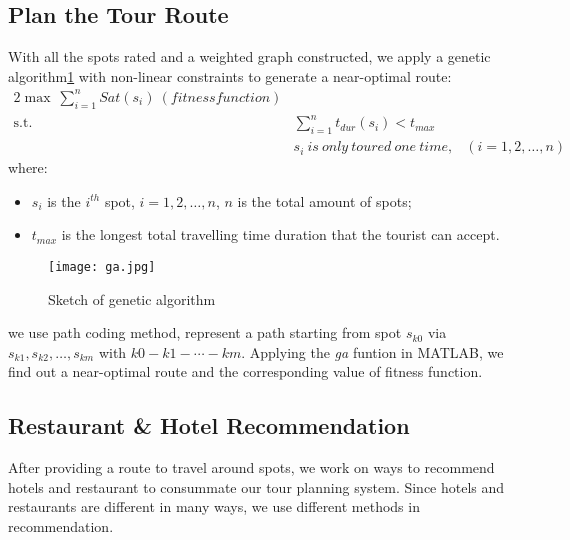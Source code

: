 \documentclass{mcmthesis}
\begin{document}
\subsection{Plan the Tour Route}
  With all the spots rated and a weighted graph constructed, we apply a genetic algorithm\ref{fig:ga} with non-linear constraints to generate a near-optimal route:
  \begin{alignat}{2}   %
    \max~\sum_{i=1}^{n}Sat(s_{i})~(fitness function)\\
    \mbox{s.t.}\quad
    &\sum_{i=1}^{n}t_{dur}(s_{i}) < t_{max}\\
    &s_{i}~is~only~toured~one~time, & (i=1,2,\ldots,n)
  \end{alignat}
  where:
  \begin{itemize}
    \item $s_{i}$ is the $i^{th}$ spot, $i=1,2,\ldots,n$, $n$ is the total amount of spots;
    \item $t_{max}$ is the longest total travelling time duration that the tourist can accept.
  \end{itemize}
  \begin{figure}[ht]
    \centering
    \texttt{[image: ga.jpg]}
    \caption{Sketch of genetic algorithm}
    \label{fig:ga}
  \end{figure}
  we use path coding method, represent a path starting from spot $s_{k0}$ via $s_{k1}, s_{k2},\ldots,s_{km}$ with $k0-k1-\cdots-km$. Applying the \emph{ga} funtion in MATLAB, we find out a near-optimal route and the corresponding value of fitness function.

  



\subsection{Restaurant \& Hotel Recommendation}
  After providing a route to travel around spots, we work on ways to recommend hotels and restaurant to consummate our tour planning system. Since hotels and restaurants are different in many ways, we use different methods in recommendation.
\end{document}
